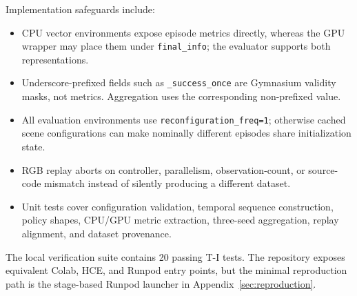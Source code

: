 Implementation safeguards include:
\begin{itemize}
    \item CPU vector environments expose episode metrics directly, whereas the GPU wrapper may
    place them under \texttt{final\_info}; the evaluator supports both representations.
    \item Underscore-prefixed fields such as \texttt{\_success\_once} are Gymnasium validity masks,
    not metrics. Aggregation uses the corresponding non-prefixed value.
    \item All evaluation environments use \texttt{reconfiguration\_freq=1}; otherwise cached scene
    configurations can make nominally different episodes share initialization state.
    \item RGB replay aborts on controller, parallelism, observation-count, or source-code mismatch
    instead of silently producing a different dataset.
    \item Unit tests cover configuration validation, temporal sequence construction, policy shapes,
    CPU/GPU metric extraction, three-seed aggregation, replay alignment, and dataset provenance.
\end{itemize}

The local verification suite contains 20 passing T-I tests. The repository exposes equivalent
Colab, HCE, and Runpod entry points, but the minimal reproduction path is the stage-based Runpod
launcher in Appendix~\ref{sec:reproduction}.
